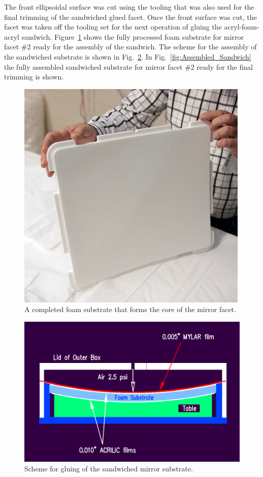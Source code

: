 The front ellipsoidal surface was cut using the tooling that was also used for the final trimming of the sandwiched
glued facet. Once the front surface was cut, the facet was taken off the tooling set for the next operation of
gluing the acryl-foam-acryl sandwich. Figure~\ref{fig:Foam_Sub} shows the fully processed foam substrate for
mirror facet \#2 ready for the assembly of the sandwich. The scheme for the assembly of the sandwiched substrate
is shown in Fig.~\ref{fig:Gluing_Sandwich}. In Fig.~\ref{fig:Assembled_Sandwich} the fully assembled sandwiched
substrate for mirror facet \#2 ready for the final trimming is shown. 

\begin{figure}[ht]
    \centering
    \includegraphics[width=0.9\linewidth]{images/Foam_Sub.png}
    \caption{A completed foam substrate that forms the core of the mirror facet.}
    \label{fig:Foam_Sub}
\end{figure}

\begin{figure}[ht]
    \centering
    \includegraphics[width=0.9\linewidth]{images/Gluing_Sandwich_New.png}
    \caption{Scheme for gluing of the sandwiched mirror substrate.}
    \label{fig:Gluing_Sandwich}
\end{figure}
 
